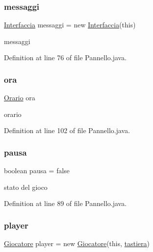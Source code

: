 \subsubsection{\texorpdfstring{messaggi}{messaggi}}
{\footnotesize\ttfamily \hyperlink{classa_1_1survival_1_1game_1_1_interfaccia}{Interfaccia} messaggi = new \hyperlink{classa_1_1survival_1_1game_1_1_interfaccia}{Interfaccia}(this)}

messaggi 

Definition at line 76 of file Pannello.\+java.

\mbox{\label{classa_1_1survival_1_1game_1_1_pannello_a74824477a3f77bce08a4ec9db0b0600c}} 
\subsubsection{\texorpdfstring{ora}{ora}}
{\footnotesize\ttfamily \hyperlink{classa_1_1survival_1_1game_1_1_orario}{Orario} ora}

orario 

Definition at line 102 of file Pannello.\+java.

\mbox{\label{classa_1_1survival_1_1game_1_1_pannello_ae6f093cf66923883b189846396dc0088}} 
\subsubsection{\texorpdfstring{pausa}{pausa}}
{\footnotesize\ttfamily boolean pausa = false}

stato del gioco 

Definition at line 89 of file Pannello.\+java.

\mbox{\label{classa_1_1survival_1_1game_1_1_pannello_a9d7f848831c53565ece98aa720fef0be}} 
\subsubsection{\texorpdfstring{player}{player}}
{\footnotesize\ttfamily \hyperlink{class_entita_1_1_giocatore}{Giocatore} player = new \hyperlink{class_entita_1_1_giocatore}{Giocatore}(this, \hyperlink{classa_1_1survival_1_1game_1_1_pannello_aa81b2ff7f225716affd276a1fff16da7}{tastiera})}

